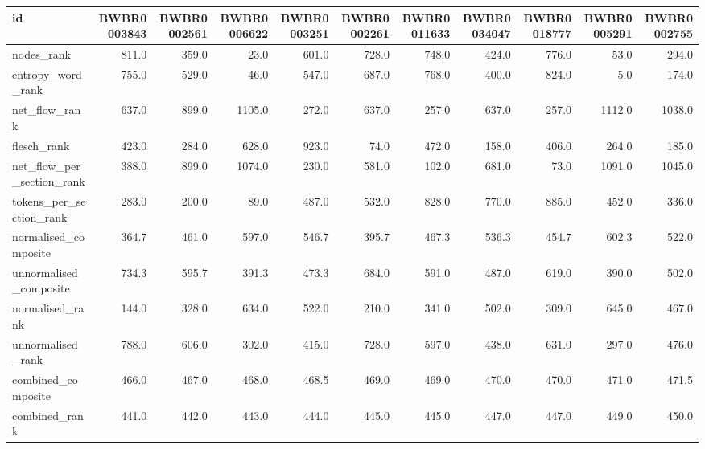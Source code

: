 \begin{tabular}{lrrrrrrrrrr}
\toprule
id & BWBR0003843 & BWBR0002561 & BWBR0006622 & BWBR0003251 & BWBR0002261 & BWBR0011633 & BWBR0034047 & BWBR0018777 & BWBR0005291 & BWBR0002755 \\
\midrule
nodes\_rank & 811.0 & 359.0 & 23.0 & 601.0 & 728.0 & 748.0 & 424.0 & 776.0 & 53.0 & 294.0 \\
\cline{1-11}
entropy\_word\_rank & 755.0 & 529.0 & 46.0 & 547.0 & 687.0 & 768.0 & 400.0 & 824.0 & 5.0 & 174.0 \\
\cline{1-11}
net\_flow\_rank & 637.0 & 899.0 & 1105.0 & 272.0 & 637.0 & 257.0 & 637.0 & 257.0 & 1112.0 & 1038.0 \\
\cline{1-11}
flesch\_rank & 423.0 & 284.0 & 628.0 & 923.0 & 74.0 & 472.0 & 158.0 & 406.0 & 264.0 & 185.0 \\
\cline{1-11}
net\_flow\_per\_section\_rank & 388.0 & 899.0 & 1074.0 & 230.0 & 581.0 & 102.0 & 681.0 & 73.0 & 1091.0 & 1045.0 \\
\cline{1-11}
tokens\_per\_section\_rank & 283.0 & 200.0 & 89.0 & 487.0 & 532.0 & 828.0 & 770.0 & 885.0 & 452.0 & 336.0 \\
\cline{1-11}
normalised\_composite & 364.7 & 461.0 & 597.0 & 546.7 & 395.7 & 467.3 & 536.3 & 454.7 & 602.3 & 522.0 \\
\cline{1-11}
unnormalised\_composite & 734.3 & 595.7 & 391.3 & 473.3 & 684.0 & 591.0 & 487.0 & 619.0 & 390.0 & 502.0 \\
\cline{1-11}
normalised\_rank & 144.0 & 328.0 & 634.0 & 522.0 & 210.0 & 341.0 & 502.0 & 309.0 & 645.0 & 467.0 \\
\cline{1-11}
unnormalised\_rank & 788.0 & 606.0 & 302.0 & 415.0 & 728.0 & 597.0 & 438.0 & 631.0 & 297.0 & 476.0 \\
\cline{1-11}
combined\_composite & 466.0 & 467.0 & 468.0 & 468.5 & 469.0 & 469.0 & 470.0 & 470.0 & 471.0 & 471.5 \\
\cline{1-11}
combined\_rank & 441.0 & 442.0 & 443.0 & 444.0 & 445.0 & 445.0 & 447.0 & 447.0 & 449.0 & 450.0 \\
\cline{1-11}
\bottomrule
\end{tabular}
